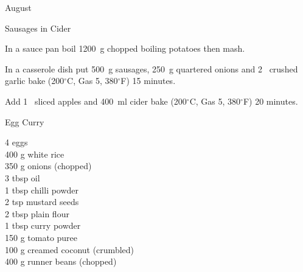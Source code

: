 \begin{menu}{August}
\begin{recipe}{2}{Sausages in Cider}
\begin{ingredients}
		\end{ingredients}
	
    \begin{instructions}
    \item 
        In a sauce pan boil
        1200~g chopped boiling potatoes
        then mash.
      \item 
        In a casserole dish put
        500~g  sausages,
        250~g quartered onions
        and
        2~ crushed garlic
        bake (200$^{\circ}$C, Gas 5, 380$^{\circ}$F) 15 minutes.
      \item 
        Add 1~ sliced apples
        and
        400~ml  cider
        bake (200$^{\circ}$C, Gas 5, 380$^{\circ}$F) 20 minutes.
      
    \end{instructions}
    \end{recipe}%
  
    \begin{recipe}{2}{Egg Curry}%
		\begin{ingredients}
		4  eggs  \\
	400 g white rice  \\
	350 g onions (chopped) \\
	3 tbsp oil  \\
	1 tbsp chilli powder  \\
	2 tsp mustard seeds  \\
	2 tbsp plain flour  \\
	1 tbsp curry powder  \\
	150 g tomato puree  \\
	100 g creamed coconut (crumbled) \\
	400 g runner beans (chopped) \\
	
		\end{ingredients}
	
	

\end{recipe}
\end{menu}
